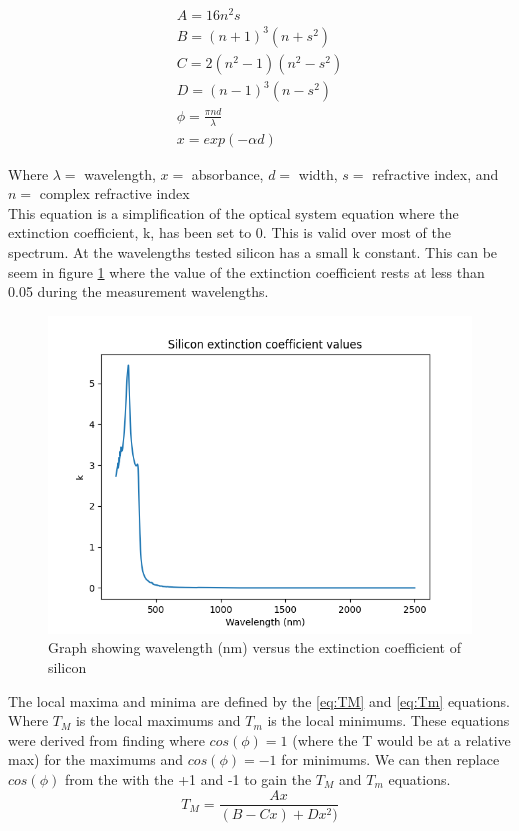 \documentclass[10pt,a4paper]{article}
\begin{document}
\begin{multicols}{2}
\begin{subequations}\label{eq:TransReg}
    \begin{align}
	A= 16n^2s \label{eq:A}\\
	B = (n+1)^3(n+s^2) \label{eq:B}\\
	C = 2(n^2-1)(n^2-s^2) \label{eq:C}\\
	D = (n-1)^3(n-s^2) \label{eq:D}\\
	\phi = \frac{\pi n d}{ \lambda} \label{eq:phi}\\
	x = exp(-\alpha d) \label{eq:x}
    \end{align}
\end{subequations}

Where $\lambda =$ wavelength, $x =$ absorbance, $d =$ width,  $s =$ refractive index, and $n =$ complex refractive index\\
This equation is a simplification of the optical system equation where the extinction coefficient, k, has been set to 0. This is valid over most of the spectrum\cite{marq}. At the wavelengths tested silicon has a small k constant. This can be seem in figure \ref{Sik} where the value of the extinction coefficient rests at less than 0.05 during the measurement wavelengths.
\begin{figure}[H]
\label{Sik}
\includegraphics[scale=0.5]{Sik}
\caption{Graph showing wavelength (nm) versus the extinction coefficient of silicon\cite{siK}}
\end{figure}

The local maxima and minima are defined by the \ref{eq:TM} and \ref{eq:Tm} equations. Where $T_M$ is the local maximums and $T_m$ is the local minimums.
These equations were derived from finding where $cos(\phi) = 1$ (where the T would be at a relative max) for the maximums and  $cos(\phi) = -1$ for minimums. We can then replace $cos(\phi)$ from the with the +1 and -1 to gain the $T_M$ and $T_m$ equations\cite{marq}.
\begin{equation}
\label{eq:TM}
T_M = \dfrac{Ax}{(B-Cx)+Dx^2)}
\end{equation}


\end{multicols}
\end{document}
